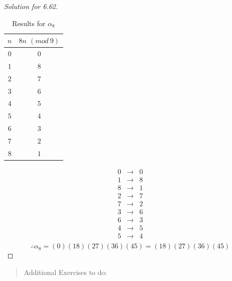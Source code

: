 \begin{assignment}[
  header=HeaderA,
  body=BodyA,
  title={Homework 4},
  duedate={\today},
  toc=false,
  toctitle={This appears on the Table of contents.},
  exlist=false
]
\begin{exer}[Problem 6.62]
\begin{proof}[Solution for 6.62]
\begin{table}[h]
\begin{tabular}{c|c}
            $n$ & $8n$ $(mod\ 9)$   \\
             \hline
             $0$ & $0$\\
             $1$ & $8$\\
             $2$ & $7$\\
             $3$ & $6$\\
             $4$ & $5$\\
             $5$ & $4$\\
             $6$ & $3$\\
             $7$ & $2$\\
             $8$ & $1$\\
        \end{tabular}
        \caption{Results for $\alpha_8$}
    \end{table}
    \[
    \begin{array}{rcl}
         0 & \to & 0  \\
         \hline
         1 & \to & 8\\
         8 & \to & 1\\
         \hline
         2 & \to & 7\\
         7 & \to & 2\\
         \hline
         3 & \to & 6 \\
         6 & \to & 3 \\
         \hline
         4 & \to & 5\\
         5 & \to & 4\\
    \end{array}
    \]
    \[
    \therefore \alpha_8 = (0)(18)(27)(36)(45) = (18)(27)(36)(45)
    \]
\end{proof}    
\end{exer}




\begin{quote}
    Additional Exercises to do:
\end{quote}



\end{assignment}
